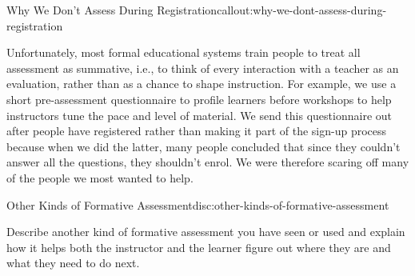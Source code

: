 \begin{callout}{Why We Don't Assess During Registration}{callout:why-we-dont-assess-during-registration}

Unfortunately, most formal educational systems train people to treat all
assessment as summative, i.e., to think of every interaction with a
teacher as an evaluation, rather than as a chance to shape instruction.
For example, we use a short pre-assessment questionnaire to profile
learners before workshops to help instructors tune the pace and level of
material. We send this questionnaire out after people have registered
rather than making it part of the sign-up process because when we did
the latter, many people concluded that since they couldn't answer all
the questions, they shouldn't enrol. We were therefore scaring off many
of the people we most wanted to help.
\end{callout}

\begin{discussion}{Other Kinds of Formative Assessment}{disc:other-kinds-of-formative-assessment}

Describe another kind of formative assessment you have seen or used and
explain how it helps both the instructor and the learner figure out
where they are and what they need to do next.
\end{discussion}
